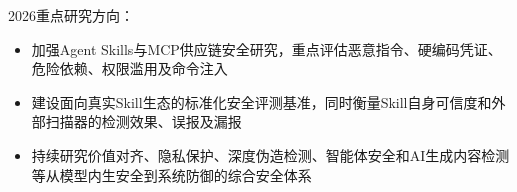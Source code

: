 \begin{longtblr}[
  caption = {我国主流 AI 智能体安全产品与落地方向},
  label   = {tab:china-agent-security-products-verified-cited},
]
\vspace{0.5em}
2026重点研究方向：
\vspace{1.5em}

\begin{itemize}[leftmargin=*,topsep=0pt,partopsep=0pt,itemsep=1pt,parsep=0pt]
    \item 加强Agent Skills与MCP供应链安全研究，重点评估恶意指令、硬编码凭证、危险依赖、权限滥用及命令注入\cite{tencent_agent_skills_security_2026}
    \item 建设面向真实Skill生态的标准化安全评测基准，同时衡量Skill自身可信度和外部扫描器的检测效果、误报及漏报\cite{tencent_skilltrustbench_2026}
    \item 持续研究价值对齐、隐私保护、深度伪造检测、智能体安全和AI生成内容检测等从模型内生安全到系统防御的综合安全体系\cite{tencent_esg_report_2025_published_2026}
\end{itemize}

  

\end{longtblr}
